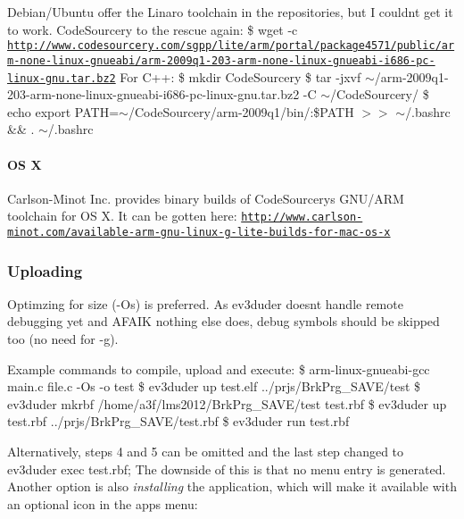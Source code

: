 Debian/\+Ubuntu offer the Linaro toolchain in the repositories, but I couldn\textquotesingle{}t get it to work. Code\+Sourcery to the rescue again\+: \$ wget -\/c \href{http://www.codesourcery.com/sgpp/lite/arm/portal/package4571/public/arm-none-linux-gnueabi/arm-2009q1-203-arm-none-linux-gnueabi-i686-pc-linux-gnu.tar.bz2}{\tt http\+://www.\+codesourcery.\+com/sgpp/lite/arm/portal/package4571/public/arm-\/none-\/linux-\/gnueabi/arm-\/2009q1-\/203-\/arm-\/none-\/linux-\/gnueabi-\/i686-\/pc-\/linux-\/gnu.\+tar.\+bz2} For C++\+: \$ mkdir Code\+Sourcery \$ tar -\/jxvf $\sim$/arm-\/2009q1-\/203-\/arm-\/none-\/linux-\/gnueabi-\/i686-\/pc-\/linux-\/gnu.tar.\+bz2 -\/\+C $\sim$/\+Code\+Sourcery/ \$ echo export P\+A\+T\+H=$\sim$/\+Code\+Sourcery/arm-\/2009q1/bin/\+:\$\+P\+A\+T\+H $>$$>$ $\sim$/.bashrc \&\& . $\sim$/.bashrc

\paragraph*{O\+S X}

Carlson-\/\+Minot Inc. provides binary builds of Code\+Sourcery\textquotesingle{}s G\+N\+U/\+A\+R\+M toolchain for O\+S X. It can be gotten here\+: \href{http://www.carlson-minot.com/available-arm-gnu-linux-g-lite-builds-for-mac-os-x}{\tt http\+://www.\+carlson-\/minot.\+com/available-\/arm-\/gnu-\/linux-\/g-\/lite-\/builds-\/for-\/mac-\/os-\/x}

\subsubsection*{Uploading}

Optimzing for size (-\/\+Os) is preferred. As ev3duder doesn\textquotesingle{}t handle remote debugging yet and A\+F\+A\+I\+K nothing else does, debug symbols should be skipped too (no need for -\/g).

Example commands to compile, upload and execute\+: \$ arm-\/linux-\/gnueabi-\/gcc main.\+c file.\+c -\/\+Os -\/o test \$ ev3duder up test.\+elf ../prjs/\+Brk\+Prg\+\_\+\+S\+A\+V\+E/test \$ ev3duder mkrbf /home/a3f/lms2012/\+Brk\+Prg\+\_\+\+S\+A\+V\+E/test test.\+rbf \$ ev3duder up test.\+rbf ../prjs/\+Brk\+Prg\+\_\+\+S\+A\+V\+E/test.rbf \$ ev3duder run test.\+rbf

Alternatively, steps 4 and 5 can be omitted and the last step changed to {\ttfamily ev3duder exec test.\+rbf}; The downside of this is that no menu entry is generated. Another option is also {\itshape installing} the application, which will make it available with an optional icon in the apps menu\+: 


